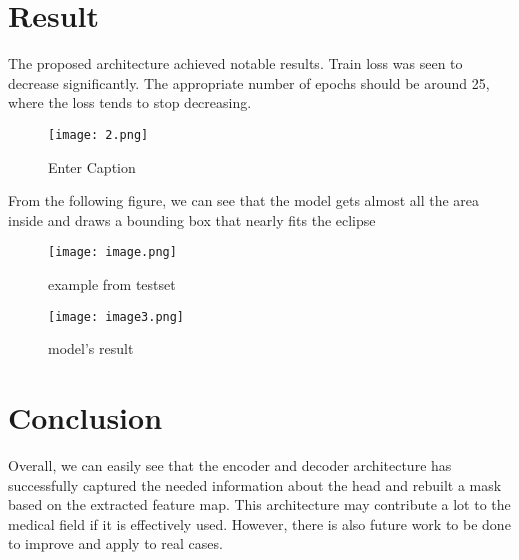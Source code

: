 \documentclass[hidelinks]{report}
\begin{document}
\chapter{Result}
The proposed architecture achieved notable results. Train loss was seen to decrease significantly. The appropriate number of epochs should be around 25, where the loss tends to stop decreasing.
\begin{figure}[H]
    \centering
    \texttt{[image: 2.png]}
    \caption{Enter Caption}
    \label{fig:enter-label}
\end{figure}
From the following figure, we can see that the model gets almost all the area inside and draws a bounding box that nearly fits the eclipse
\begin{figure}[H]
  \centering
  \begin{minipage}[b]{0.4\textwidth}
    \texttt{[image: image.png]}
    \caption{example from testset}
  \end{minipage}
  \hfill
  \centering
  \begin{minipage}[b]{0.4\textwidth}
    \texttt{[image: image3.png]}
    \caption{model's result}
  \end{minipage}
\end{figure}
\chapter{Conclusion}
Overall, we can easily see that the encoder and decoder architecture has successfully captured the needed information about the head and rebuilt a mask based on the extracted feature map. This architecture may contribute a lot to the medical field if it is effectively used. However, there is also future work to be done to improve and apply to real cases. 
\end{document}
